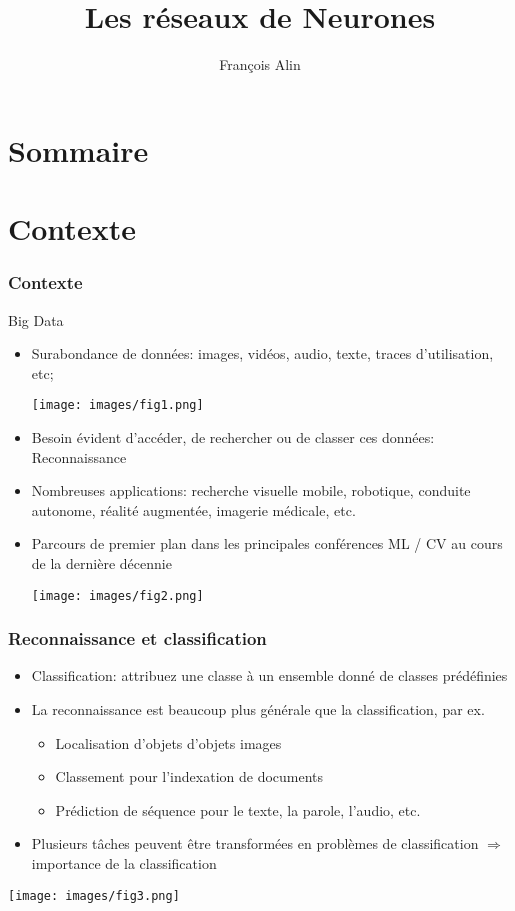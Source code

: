 \documentclass[9pt]{beamer}
\title[Introduction aux réseaux de neurones]{Les réseaux de Neurones}
\author[F. Alin]{François Alin}
\begin{document}
\begin{frame}
	\titlepage
\end{frame}


\section*{Sommaire}
\begin{frame}
	\tableofcontents
\end{frame}

\section{Contexte}
\begin{frame}
\frametitle{Contexte}
\begin{block}{Big Data}
\begin{itemize}
\item Surabondance de données: images, vidéos, audio, texte, traces d'utilisation, etc;
\begin{center}
\texttt{[image: images/fig1.png]} 
\end{center}
\item Besoin évident d'accéder, de rechercher ou de classer ces données: Reconnaissance
\item Nombreuses applications: recherche visuelle mobile, robotique, conduite autonome,
réalité augmentée, imagerie médicale, etc.
\item Parcours de premier plan dans les principales conférences ML / CV au cours de la dernière décennie
\begin{center}
\texttt{[image: images/fig2.png]} 
\end{center}
\end{itemize}
\end{block}
\end{frame}

\begin{frame}
\frametitle{Reconnaissance et classification}
\begin{itemize}
\item Classification: attribuez une classe à un ensemble donné de classes prédéfinies 
\item La reconnaissance est beaucoup plus générale que la classification, par ex.
\begin{itemize}
\item Localisation d'objets d'objets images
\item Classement pour l'indexation de documents
\item Prédiction de séquence pour le texte, la parole, l'audio, etc.
\end{itemize}
\item Plusieurs tâches peuvent être transformées en problèmes de classification  $\Rightarrow$ importance de la classification
\end{itemize}
\begin{center}
\texttt{[image: images/fig3.png]} 
\end{center}
\end{frame}
\end{document}
